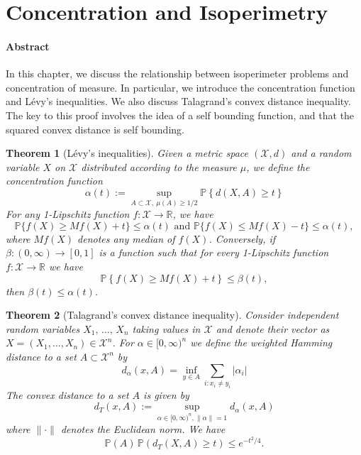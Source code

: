 \documentclass[reqno]{amsproc}
\newtheorem{theorem}{Theorem}
\newcommand{\R}{\mathbb{R}}
\renewcommand{\P}{\mathbb{P}} %
\newcommand{\X}{\mathcal{X}}
\begin{document}

\section{Concentration and Isoperimetry}
\label{sec:iso}
\paragraph{\textbf{Abstract}}
	In this chapter, we discuss the relationship between isoperimeter problems and concentration of measure.
	In particular, we introduce the concentration function and L\'evy's inequalities.
	We also discuss Talagrand's convex distance inequality.
	The key to this proof involves the idea of a self bounding function, and that the squared convex distance is self bounding.

\begin{theorem}[L\'evy's inequalities]
\label{thm:levy}
	Given a metric space $(\X, d)$ and a random variable $X$ on $\X$ distributed according to the measure $\mu$, we define the concentration function
	\[\alpha(t) := \sup_{A \subset \X, \ \mu(A) \geq 1/2} \P \left\{ d(X,A) \geq t \right \} \]
	For any 1-Lipschitz function $f: \X \to \R$, we have
	\[\P \{f(X) \geq Mf(X) + t \} \leq \alpha(t) \textrm{ and } \P \{f(X) \leq Mf(X) - t \} \leq \alpha(t), \]
	where $Mf(X)$ denotes any median of $f(X)$. Conversely, if $\beta : (0,\infty) \to [0,1]$ is a function such that for every 1-Lipschitz function $f : \X \to \R$ we have 
	\[ \P \left\{f(X) \geq Mf(X) + t \right\} \leq \beta(t),\]
	then $\beta(t) \leq \alpha(t)$.
\end{theorem}

\begin{theorem}[Talagrand's convex distance inequality]
\label{thm:tal}
	Consider independent random variables $X_1,\, \dots,\, X_n$ taking values in $\X$ and denote their vector as $X = (X_1, \dots, X_n) \in \X^n$.
	For $\alpha \in [0, \infty)^n$ we define the weighted Hamming distance to a set $A \subset \X^n$ by
	\[d_{\alpha}(x, A) = \inf_{y \in A} \sum_{i: x_i \not = y_i} |\alpha_i| \]
	The convex distance to a set $A$ is given by
	\begin{equation}
	\label{eq:conv_dist}
		d_T(x, A) := \sup_{ \alpha \in [0, \infty)^n, \|\alpha\| = 1} d_{\alpha}(x,A)
	\end{equation}
	where $\|\cdot\|$ denotes the Euclidean norm.
	We have
	\[\P(A)\,\P(d_T(X,A) \geq t) \leq e^{-t^2/4}.\]
\end{theorem}
\end{document}
